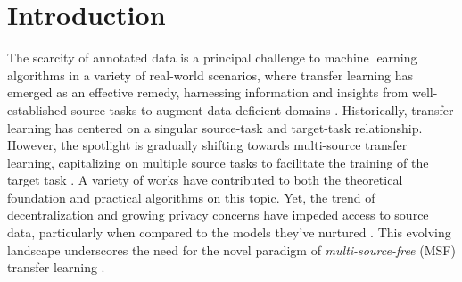 \documentclass[letterpaper]{article} %
\begin{document}
\section{Introduction}

The scarcity of annotated data is a principal challenge to machine learning algorithms in a variety of real-world scenarios, where transfer learning has emerged as an effective remedy, harnessing information and insights from well-established source tasks to augment data-deficient domains \citep[see][]{perkins1992transfer, weiss2016survey, zhuang2020comprehensive}. Historically, transfer learning has centered on a singular source-task and target-task relationship. However, the spotlight is gradually shifting towards multi-source transfer learning, capitalizing on multiple source tasks to facilitate the training of the target task \citep[see][]{sun2015survey}. A variety of works have contributed to both the theoretical foundation and practical algorithms on this topic.
Yet, the trend of decentralization and growing privacy concerns have impeded access to source data, particularly when compared to the models they've nurtured \citep{feng2021kd3a}. This evolving landscape underscores the need for the novel paradigm of \textit{multi-source-free} (MSF) transfer learning \citep{fang2022source}.




\end{document}
